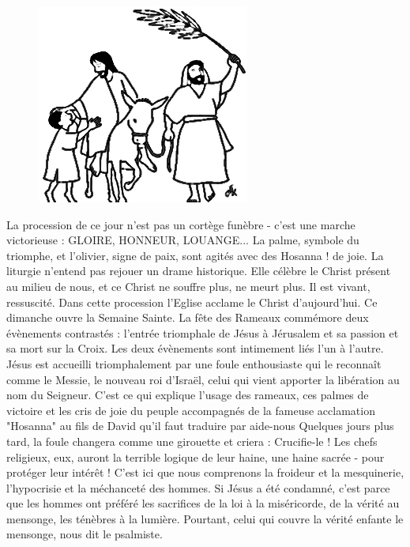 	\begin{figure}
		\includegraphics[width=1.4\linewidth]{foule_rameaux.png}
	\end{figure}
La procession de ce jour n’est pas un cortège funèbre - c’est
une marche victorieuse : GLOIRE, HONNEUR, LOUANGE... La
palme, symbole du triomphe, et l’olivier, signe de paix, sont
agités avec des \og Hosanna ! \fg de joie.
La liturgie n’entend pas rejouer un drame historique. Elle
célèbre le Christ présent au milieu de nous, et ce Christ ne
souffre plus, ne meurt plus. Il est vivant, ressuscité.
Dans cette procession l’Eglise acclame le Christ d’aujourd’hui.
Ce dimanche ouvre la Semaine Sainte. La fête des Rameaux commémore deux
évènements contrastés : l’entrée triomphale de Jésus à Jérusalem et sa passion et
sa mort sur la Croix. Les deux évènements sont intimement liés l’un à l’autre.
Jésus est accueilli triomphalement par une foule enthousiaste qui le reconnaît
comme le Messie, le nouveau roi d’Israël, celui qui vient apporter la libération au
nom du Seigneur. C’est ce qui explique l’usage des rameaux, ces palmes de
victoire et les cris de joie du peuple accompagnés de la fameuse acclamation
"Hosanna" au fils de David qu’il faut traduire par \og aide-nous \fg
Quelques jours plus tard, la foule changera comme une girouette et criera :
Crucifie-le ! Les chefs religieux, eux, auront la terrible logique de leur haine, une
haine sacrée - pour protéger leur intérêt ! C’est ici que nous comprenons la
froideur et la mesquinerie, l’hypocrisie et la méchanceté des hommes. Si Jésus a
été condamné, c’est parce que les hommes ont préféré les sacrifices de la loi à la
miséricorde, de la vérité au mensonge, les ténèbres à la lumière. Pourtant, celui
qui couvre la vérité enfante le mensonge, nous dit le psalmiste.

